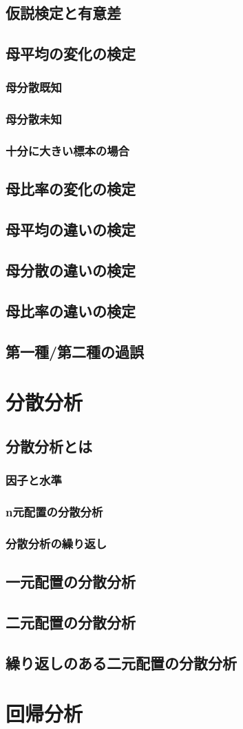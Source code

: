 \documentclass[11pt,a4paper]{jsarticle}                    %
\begin{document}
\subsection{仮説検定と有意差}
\subsection{母平均の変化の検定}
\subsubsection{母分散既知}
\subsubsection{母分散未知}
\subsubsection{十分に大きい標本の場合}
\subsection{母比率の変化の検定}
\subsection{母平均の違いの検定}
\subsection{母分散の違いの検定}
\subsection{母比率の違いの検定}
\subsection{第一種/第二種の過誤}

\section{分散分析}
\subsection{分散分析とは}
\subsubsection{因子と水準}
\subsubsection{n元配置の分散分析}
\subsubsection{分散分析の繰り返し}
\subsection{一元配置の分散分析}
\subsection{二元配置の分散分析}
\subsection{繰り返しのある二元配置の分散分析}
\section{回帰分析}
\end{document}
